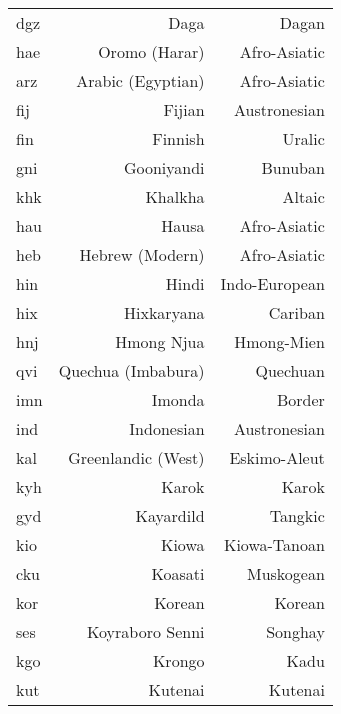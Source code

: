\begin{longtable}{|l|r|r|}
dgz                & Daga                      & Dagan                \\
hae                & Oromo (Harar)             & Afro-Asiatic         \\
arz                & Arabic (Egyptian)         & Afro-Asiatic         \\
fij                & Fijian                    & Austronesian         \\
fin                & Finnish                   & Uralic               \\
gni                & Gooniyandi                & Bunuban              \\
khk                & Khalkha                   & Altaic               \\
hau                & Hausa                     & Afro-Asiatic         \\
heb                & Hebrew (Modern)           & Afro-Asiatic         \\
hin                & Hindi                     & Indo-European        \\
hix                & Hixkaryana                & Cariban              \\
hnj                & Hmong Njua                & Hmong-Mien           \\
qvi                & Quechua (Imbabura)        & Quechuan             \\
imn                & Imonda                    & Border               \\
ind                & Indonesian                & Austronesian         \\
kal                & Greenlandic (West)        & Eskimo-Aleut         \\
kyh                & Karok                     & Karok                \\
gyd                & Kayardild                 & Tangkic              \\
kio                & Kiowa                     & Kiowa-Tanoan         \\
cku                & Koasati                   & Muskogean            \\
kor                & Korean                    & Korean               \\
ses                & Koyraboro Senni           & Songhay              \\
kgo                & Krongo                    & Kadu                 \\
kut                & Kutenai                   & Kutenai              \\

\end{longtable}
